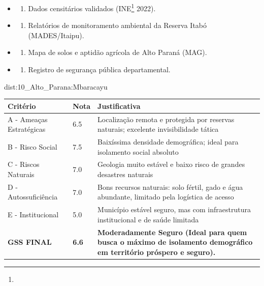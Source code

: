 {\begin{itemize}
\tightlist
\item
  \begin{enumerate}
  \def\labelenumi{\arabic{enumi})}
  \tightlist
  \item
    Dados censitários validados (INE\footnote{\fineINE} 2022).
  \end{enumerate}
\item
  \begin{enumerate}
  \def\labelenumi{\arabic{enumi})}
  \setcounter{enumi}{1}
  \tightlist
  \item
    Relatórios de monitoramento ambiental da Reserva Itabó
    (MADES/\allowbreak Itaipu).
  \end{enumerate}
\item
  \begin{enumerate}
  \def\labelenumi{\arabic{enumi})}
  \setcounter{enumi}{2}
  \tightlist
  \item
    Mapa de solos e aptidão agrícola de Alto Paraná (MAG).
  \end{enumerate}
\item
  \begin{enumerate}
  \def\labelenumi{\arabic{enumi})}
  \setcounter{enumi}{3}
  \tightlist
  \item
    Registro de segurança pública departamental.
  \end{enumerate}
\end{itemize}}{dist:10_Alto_Parana:Mbaracayu}
\begin{table}[ht!]
\small \begin{tabular}{p{3.0cm}p{0.8cm}p{6.0cm}} \toprule
\textbf{Critério} & \textbf{Nota} & \textbf{Justificativa} \\ \midrule
A - Ameaças Estratégicas & 6.5 & Localização remota e protegida por reservas naturais; excelente invisibilidade tática \\
B - Risco Social & 7.5 & Baixíssima densidade demográfica; ideal para isolamento social absoluto \\
C - Riscos Naturais & 7.0 & Geologia muito estável e baixo risco de grandes desastres naturais \\
D - Autossuficiência & 7.0 & Bons recursos naturais: solo fértil, gado e água abundante, limitado pela logística de acesso \\
E - Institucional & 5.0 & Município estável seguro, mas com infraestrutura institucional e de saúde limitada \\
\midrule \textbf{GSS FINAL} & \textbf{6.6} & \textbf{Moderadamente Seguro (Ideal para quem busca o máximo de isolamento demográfico em território próspero e seguro).} \\ \bottomrule \end{tabular}
\end{table}
